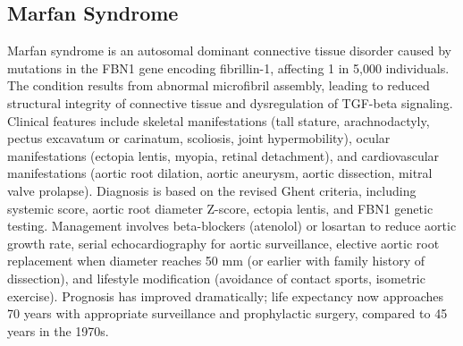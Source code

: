 \subsection{Marfan Syndrome}
\label{sec:Marfan Syndrome}
Marfan syndrome is an autosomal dominant connective tissue disorder caused by mutations in the FBN1 gene encoding fibrillin-1, affecting 1 in 5,000 individuals. The condition results from abnormal microfibril assembly, leading to reduced structural integrity of connective tissue and dysregulation of TGF-beta signaling. Clinical features include skeletal manifestations (tall stature, arachnodactyly, pectus excavatum or carinatum, scoliosis, joint hypermobility), ocular manifestations (ectopia lentis, myopia, retinal detachment), and cardiovascular manifestations (aortic root dilation, aortic aneurysm, aortic dissection, mitral valve prolapse). Diagnosis is based on the revised Ghent criteria, including systemic score, aortic root diameter Z-score, ectopia lentis, and FBN1 genetic testing. Management involves beta-blockers (atenolol) or losartan to reduce aortic growth rate, serial echocardiography for aortic surveillance, elective aortic root replacement when diameter reaches 50 mm (or earlier with family history of dissection), and lifestyle modification (avoidance of contact sports, isometric exercise). Prognosis has improved dramatically; life expectancy now approaches 70 years with appropriate surveillance and prophylactic surgery, compared to 45 years in the 1970s.

